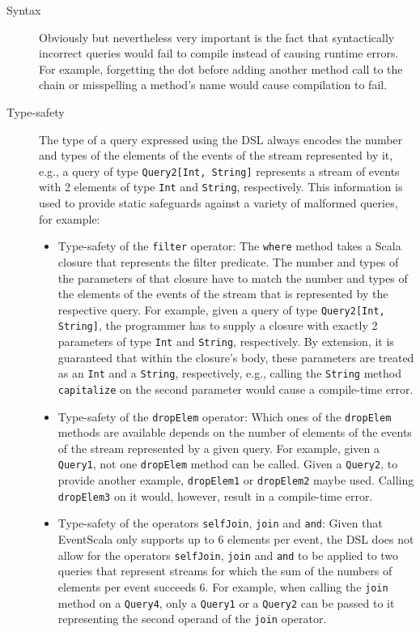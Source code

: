 \documentclass[article, type=bsc, colorback, accentcolor=tud8b, parskip=half, bibliography=totocnumbered]{tudthesis}
\begin{document}
\begin{description}

\item[Syntax]
Obviously but nevertheless very important is the fact that syntactically incorrect queries would fail to compile instead of causing runtime errors.
For example, forgetting the dot before adding another method call to the chain or misspelling a method's name would cause compilation to fail.

\item[Type-safety]
The type of a query expressed using the DSL always encodes the number and types of the elements of the events of the stream represented by it, e.g., a query of type \lstinline{Query2[Int, String]} represents a stream of events with 2 elements of type \lstinline{Int} and \lstinline{String}, respectively.
This information is used to provide static safeguards against a variety of malformed queries, for example:

\begin{itemize}

\item
Type-safety of the \lstinline{filter} operator:
The \lstinline{where} method takes a Scala closure that represents the filter predicate.
The number and types of the parameters of that closure have to match the number and types of the elements of the events of the stream that is represented by the respective query.
For example, given a query of type \lstinline{Query2[Int, String]}, the programmer has to supply a closure with exactly 2 parameters of type \lstinline{Int} and \lstinline{String}, respectively.
By extension, it is guaranteed that within the closure's body, these parameters are treated as an \lstinline{Int} and a \lstinline{String}, respectively, e.g., calling the \lstinline{String} method \lstinline{capitalize} on the second parameter would cause a compile-time error.

\item
Type-safety of the \lstinline{dropElem} operator:
Which ones of the \lstinline{dropElem} methods are available depends on the number of elements of the events of the stream represented by a given query.
For example, given a \lstinline{Query1}, not one \lstinline{dropElem} method can be called.
Given a \lstinline{Query2}, to provide another example, \lstinline{dropElem1} or \lstinline{dropElem2} maybe used.
Calling \lstinline{dropElem3} on it would, however, result in a compile-time error.

\item
Type-safety of the operators \lstinline{selfJoin}, \lstinline{join} and \lstinline{and}:
Given that EventScala only supports up to 6 elements per event, the DSL does not allow for the operators \lstinline{selfJoin}, \lstinline{join} and \lstinline{and} to be applied to two queries that represent streams for which the sum of the numbers of elements per event succeeds 6.
For example, when calling the \lstinline{join} method on a \lstinline{Query4}, only a \lstinline{Query1} or a \lstinline{Query2} can be passed to it representing the second operand of the \lstinline{join} operator.


\end{itemize}
\end{description}
\end{document}
